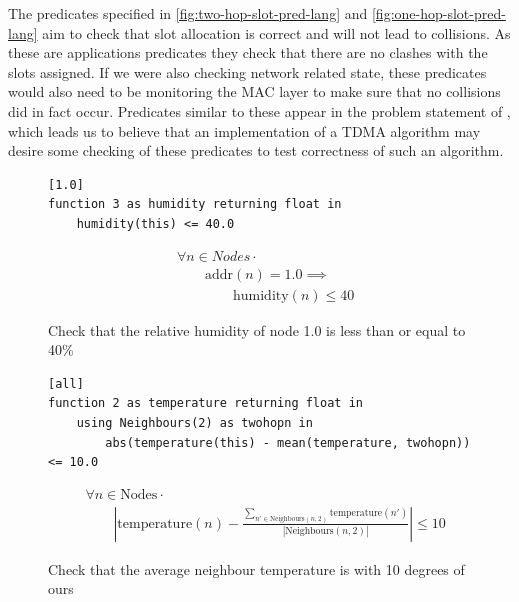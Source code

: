 The predicates specified in \autoref{fig:two-hop-slot-pred-lang} and \autoref{fig:one-hop-slot-pred-lang} aim to check that slot allocation is correct and will not lead to collisions. As these are applications predicates they check that there are no clashes with the slots assigned. If we were also checking network related state, these predicates would also need to be monitoring the MAC layer to make sure that no collisions did in fact occur. Predicates similar to these appear in the problem statement of \cite{DBLP:journals/corr/abs-0808-0920}, which leads us to believe that an implementation of a TDMA algorithm may desire some checking of these predicates to test correctness of such an algorithm.

\begin{figure}[H]
\begin{minipage}{.5\linewidth}
\begin{lstlisting}
[1.0]
function 3 as humidity returning float in
    humidity(this) <= 40.0
\end{lstlisting}
\end{minipage}%
\begin{minipage}{.5\linewidth}
\begin{align*}
&				\forall n \in Nodes \cdot \\
& \hspace{2em}		\text{addr}(n) = 1.0 \implies \\
& \hspace{4em}			\text{humidity}(n) \leq 40
\end{align*}
\end{minipage}
\caption{Check that the relative humidity of node 1.0 is less than or equal to 40\%}
\label{fig:app1-pred-lang}
\end{figure}

\begin{figure}[H]
\begin{minipage}{.5\linewidth}
\begin{lstlisting}
[all]
function 2 as temperature returning float in
    using Neighbours(2) as twohopn in
        abs(temperature(this) - mean(temperature, twohopn)) <= 10.0
\end{lstlisting}
\end{minipage}

\begin{minipage}{.5\linewidth}
\begin{align*}
&				\forall n \in \text{Nodes} \cdot \\
& \hspace{2em}		\left|\text{temperature}(n) - \frac{\sum\limits_{n' \in \text{Neighbours}(n, 2)} \text{temperature}(n')}{|\text{Neighbours}(n, 2)|} \right| \leq 10
\end{align*}
\end{minipage}
\caption{Check that the average neighbour temperature is with 10 degrees of ours}
\label{fig:app2-pred-lang}
\end{figure}


